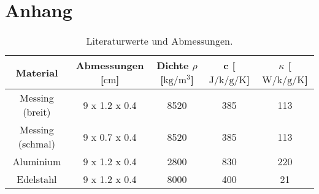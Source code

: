 \section{Anhang}

\begin{table}
    \centering
    \caption{Literaturwerte und Abmessungen. \cite{skript} \cite{lit}}
    \label{tab:einfach}
    \begin{tabular}{c |c |c |c | c}
        \toprule
        Material   & Abmessungen [$\si{\centi\meter}$] &  Dichte $\rho$ [$\si{\kilo\gram\per\meter\tothe{3}}$]  & c [$\si{\joule\per\kilo\per\gram\per\kelvin}$] & $\kappa$ [$\si{\watt\per\kilo\per\gram\per\kelvin}$] \\
        \midrule
        Messing (breit)     &   9 x 1.2 x 0.4   & 8520& 385 & 113\\
        Messing (schmal)     &   9 x 0.7 x 0.4   & 8520& 385 & 113\\
        Aluminium&      9 x 1.2 x 0.4& 2800& 830& 220 \\
        Edelstahl&      9 x 1.2 x 0.4& 8000& 400& 21 \\
        \bottomrule
    \end{tabular}
\end{table}
